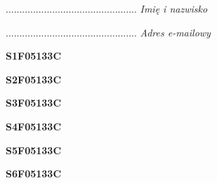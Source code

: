 \begin{turn}{90}\begin{minipage}{\linewidth} \vspace{20mm} ................................................  \textit{Imię i nazwisko}\end{minipage}\end{turn}

\begin{turn}{90}\begin{minipage}{\linewidth} \vspace{20mm} ................................................  \textit{Adres e-mailowy}\end{minipage}\end{turn}

\begin{turn}{90}\huge \begin{minipage}{\linewidth} \vspace{10mm}\textbf{S1F05133C}\end{minipage}\end{turn}

\begin{turn}{90}\huge \begin{minipage}{\linewidth} \vspace{10mm}\textbf{S2F05133C}\end{minipage}\end{turn}

\begin{turn}{90}\huge \begin{minipage}{\linewidth} \vspace{10mm}\textbf{S3F05133C}\end{minipage}\end{turn}

\begin{turn}{90}\huge \begin{minipage}{\linewidth} \vspace{10mm}\textbf{S4F05133C}\end{minipage}\end{turn}

\begin{turn}{90}\huge \begin{minipage}{\linewidth} \vspace{10mm}\textbf{S5F05133C}\end{minipage}\end{turn}

\begin{turn}{90}\huge \begin{minipage}{\linewidth} \vspace{10mm}\textbf{S6F05133C}\end{minipage}\end{turn}

